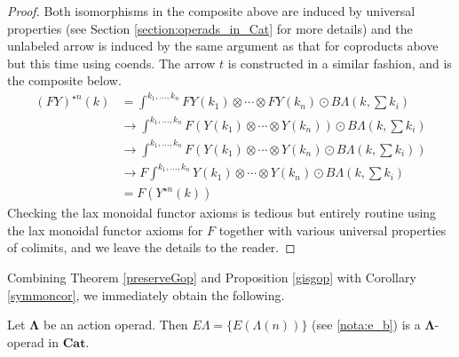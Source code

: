 \documentclass{amsbook} %
\newcommand{\mb}{\mathbf}
\numberwithin{section}{chapter}
\begin{document}
\begin{proof}
Both isomorphisms in the composite above are induced by universal properties (see Section \ref{section:operads_in_Cat} for more details) and the unlabeled arrow is induced by the same argument as that for coproducts above but this time using coends.  The arrow $t$ is constructed in a similar fashion, and is the composite below.
  \begin{align*}
    (FY)^{\star n}(k) & =  \int^{k_{1}, \ldots, k_{n}} FY(k_{1}) \otimes \cdots \otimes FY(k_{n}) \odot B\Lambda(k, \sum k_{i}) \\
    & \rightarrow   \int^{k_{1}, \ldots, k_{n}} F(Y(k_{1}) \otimes \cdots \otimes Y(k_{n})) \odot B\Lambda(k, \sum k_{i}) \\
    & \rightarrow  \int^{k_{1}, \ldots, k_{n}} F(Y(k_{1}) \otimes \cdots \otimes Y(k_{n}) \odot B\Lambda(k, \sum k_{i}) ) \\
    & \rightarrow  F\int^{k_{1}, \ldots, k_{n}} Y(k_{1}) \otimes \cdots \otimes Y(k_{n}) \odot B\Lambda(k, \sum k_{i})  \\
    & =  F(Y^{\star n}(k))
  \end{align*}
Checking the lax monoidal functor axioms is tedious but entirely routine using the lax monoidal functor axioms for $F$ together with various universal properties of colimits, and we leave the details to the reader.
\end{proof}

Combining Theorem \ref{preserveGop} and Proposition \ref{gisgop} with Corollary \ref{symmoncor}, we immediately obtain the following.

\begin{cor}\label{cor:elambda_lambdaop}
Let $\mb{\Lambda}$ be an action operad.  Then $E\Lambda = \{ E\left(\Lambda(n)\right) \}$ (see \cref{nota:e_b}) is a $\mb{\Lambda}$-operad in $\mb{Cat}$.
\end{cor}
\end{document}
